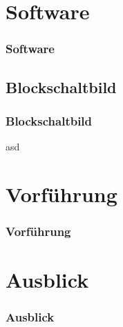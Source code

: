 \documentclass[12pt,utf8]{beamer}
\begin{document}
\section{Software}
\begin{frame}
\frametitle{Software}

\end{frame}

\subsection{Blockschaltbild}
\begin{frame}
\frametitle{Blockschaltbild}
asd
\end{frame}


\section{Vorführung}
\begin{frame}
\frametitle{Vorführung}

\end{frame}

\section{Ausblick}
\begin{frame}
\frametitle{Ausblick}

\end{frame}
\end{document}
